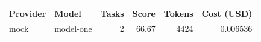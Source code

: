 \begin{tabular}{llrrrr}
\toprule
Provider & Model & Tasks & Score & Tokens & Cost (USD) \\
\midrule
mock & model-one & 2 & 66.67 & 4424 & 0.006536 \\
\bottomrule
\end{tabular}
